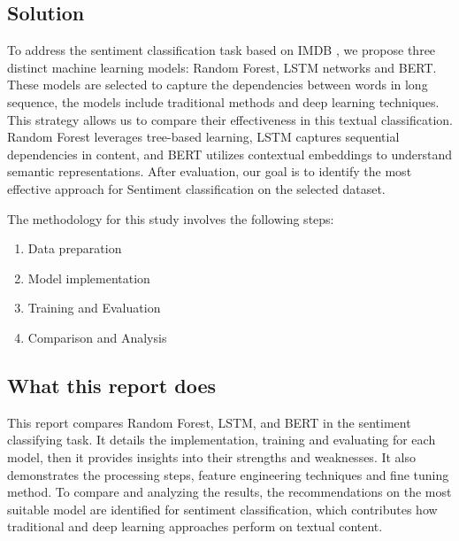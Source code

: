 \subsection{Solution}
To address the sentiment classification task based on IMDB \cite{stanfordnlp2025imdb}, we propose three distinct machine learning models: Random Forest, LSTM networks and BERT. These models are selected to capture the dependencies between words in long sequence, the models include traditional methods and deep learning techniques. This strategy allows us to compare their effectiveness in this textual classification. Random Forest leverages tree-based learning, LSTM captures sequential dependencies in content, and BERT utilizes contextual embeddings to understand semantic representations. After evaluation, our goal is to identify the most effective approach for Sentiment classification on the selected dataset.

The methodology for this study involves the following steps:
\begin{enumerate}
    \item Data preparation
    \item Model implementation
    \item Training and Evaluation
    \item Comparison and Analysis
\end{enumerate}


\subsection{What this report does}
This report compares Random Forest, LSTM, and BERT in the sentiment classifying task. It details the implementation, training and evaluating for each model, then it provides insights into their strengths and weaknesses. It also demonstrates the processing steps, feature engineering techniques and fine tuning method. To compare and analyzing the results, the recommendations on the most suitable model are identified for sentiment classification, which contributes how traditional and deep learning approaches perform on textual content.